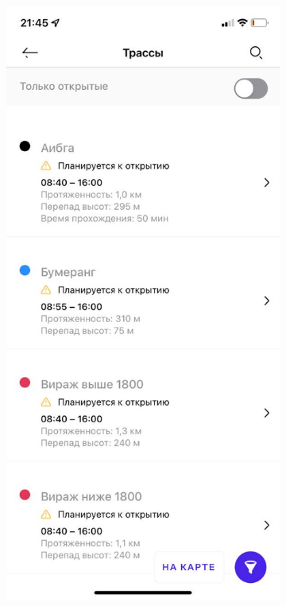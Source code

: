 \begin{figure}[h!]
\begin{center}
\begin{subfigure}{.33\textwidth}
			\includegraphics[width=.95\linewidth]{../imgs/analogue_apps/rslope.png}
			\label{img:rslope}
			\captionsetup{justification=centering}
			\caption{}
		\end{subfigure}%

\end{center}
\end{figure}
